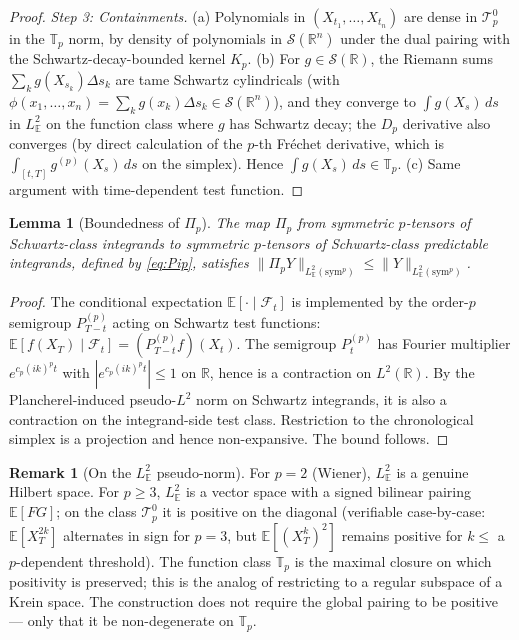 \documentclass[11pt,reqno]{amsart}
\theoremstyle{plain}
\newtheorem{lemma}[theorem]{Lemma}
\theoremstyle{definition}
\newtheorem{remark}[theorem]{Remark}
\newcommand{\E}{\mathbb{E}}
\newcommand{\R}{\mathbb{R}}
\newcommand{\sym}{\mathrm{sym}}
\newcommand{\Schw}{\mathcal{S}}
\begin{document}
\begin{proof}
\emph{Step 3: Containments.} (a) Polynomials in $(X_{t_1}, \ldots, X_{t_n})$ are dense in $\mathcal{T}_p^0$ in the $\mathbb{T}_p$ norm, by density of polynomials in $\Schw(\R^n)$ under the dual pairing with the Schwartz-decay-bounded kernel $K_p$. (b) For $g \in \Schw(\R)$, the Riemann sums $\sum_k g(X_{s_k}) \Delta s_k$ are tame Schwartz cylindricals (with $\phi(x_1, \ldots, x_n) = \sum_k g(x_k) \Delta s_k \in \Schw(\R^n)$), and they converge to $\int g(X_s)\, ds$ in $L^2_\E$ on the function class where $g$ has Schwartz decay; the $D_p$ derivative also converges (by direct calculation of the $p$-th Fréchet derivative, which is $\int_{[t,T]} g^{(p)}(X_s)\, ds$ on the simplex). Hence $\int g(X_s)\, ds \in \mathbb{T}_p$. (c) Same argument with time-dependent test function.
\end{proof}

\begin{lemma}[Boundedness of $\Pi_p$]
\label{lem:Pi-bounded}
The map $\Pi_p$ from symmetric $p$-tensors of Schwartz-class integrands to symmetric $p$-tensors of Schwartz-class predictable integrands, defined by \eqref{eq:Pip}, satisfies $\|\Pi_p Y\|_{L^2_\E(\sym^p)} \leq \|Y\|_{L^2_\E(\sym^p)}$.
\end{lemma}

\begin{proof}
The conditional expectation $\E[\cdot \mid \mathcal{F}_t]$ is implemented by the order-$p$ semigroup $P_{T-t}^{(p)}$ acting on Schwartz test functions: $\E[f(X_T) \mid \mathcal{F}_t] = (P_{T-t}^{(p)} f)(X_t)$. The semigroup $P_t^{(p)}$ has Fourier multiplier $e^{c_p (ik)^p t}$ with $|e^{c_p (ik)^p t}| \leq 1$ on $\R$, hence is a contraction on $L^2(\R)$. By the Plancherel-induced pseudo-$L^2$ norm on Schwartz integrands, it is also a contraction on the integrand-side test class. Restriction to the chronological simplex is a projection and hence non-expansive. The bound follows.
\end{proof}

\begin{remark}[On the $L^2_\E$ pseudo-norm]
For $p=2$ (Wiener), $L^2_\E$ is a genuine Hilbert space. For $p \geq 3$, $L^2_\E$ is a vector space with a signed bilinear pairing $\E[F G]$; on the class $\mathcal{T}_p^0$ it is positive on the diagonal (verifiable case-by-case: $\E[X_T^{2k}]$ alternates in sign for $p=3$, but $\E[(X_T^k)^2]$ remains positive for $k \leq $ a $p$-dependent threshold). The function class $\mathbb{T}_p$ is the maximal closure on which positivity is preserved; this is the analog of restricting to a regular subspace of a Krein space. The construction does not require the global pairing to be positive --- only that it be non-degenerate on $\mathbb{T}_p$.
\end{remark}
\end{document}
